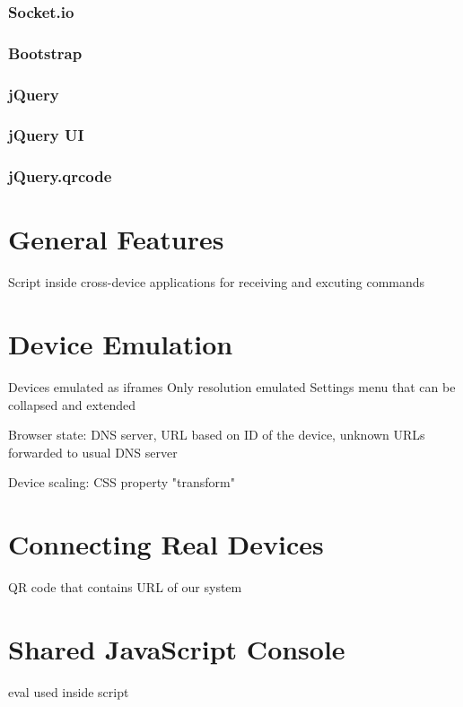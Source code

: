 \subsubsection{Socket.io}

\subsubsection{Bootstrap}

\subsubsection{jQuery}

\subsubsection{jQuery UI}

\subsubsection{jQuery.qrcode}

\section{General Features}
Script inside cross-device applications for receiving and excuting commands

\section{Device Emulation}

Devices emulated as iframes
Only resolution emulated
Settings menu that can be collapsed and extended

Browser state: DNS server, URL based on ID of the device, unknown URLs forwarded to usual DNS server

Device scaling: CSS property "transform"

\section{Connecting Real Devices}

QR code that contains URL of our system

\section{Shared JavaScript Console}

eval used inside script

